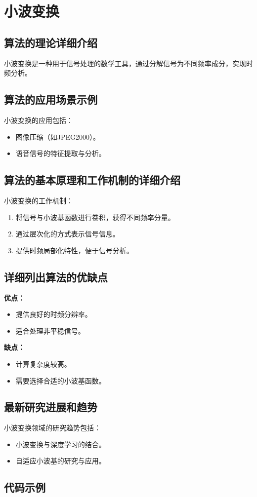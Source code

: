 \section{小波变换}
\subsection*{算法的理论详细介绍}
小波变换是一种用于信号处理的数学工具，通过分解信号为不同频率成分，实现时频分析。

\subsection*{算法的应用场景示例}
小波变换的应用包括：
\begin{itemize}
    \item 图像压缩（如JPEG2000）。
    \item 语音信号的特征提取与分析。
\end{itemize}

\subsection*{算法的基本原理和工作机制的详细介绍}
小波变换的工作机制：
\begin{enumerate}
    \item 将信号与小波基函数进行卷积，获得不同频率分量。
    \item 通过层次化的方式表示信号信息。
    \item 提供时频局部化特性，便于信号分析。
\end{enumerate}

\subsection*{详细列出算法的优缺点}
\textbf{优点：}
\begin{itemize}
    \item 提供良好的时频分辨率。
    \item 适合处理非平稳信号。
\end{itemize}

\textbf{缺点：}
\begin{itemize}
    \item 计算复杂度较高。
    \item 需要选择合适的小波基函数。
\end{itemize}

\subsection*{最新研究进展和趋势}
小波变换领域的研究趋势包括：
\begin{itemize}
    \item 小波变换与深度学习的结合。
    \item 自适应小波基的研究与应用。
\end{itemize}
\subsection*{代码示例}
\begin{lstlisting}

\end{lstlisting}


